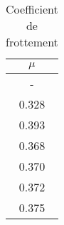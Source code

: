 \begin{table}
\centering
\begin{tabular}{|c|}
\hline
$\mu$ \\
\hline
- \\
\hline
0.328 \\
\hline
0.393 \\
\hline
0.368 \\
\hline
0.370 \\
\hline
0.372 \\
\hline
0.375 \\
\hline
\end{tabular}
\caption{Coefficient de frottement}
\label{table:coeffbb}
\end{table}
